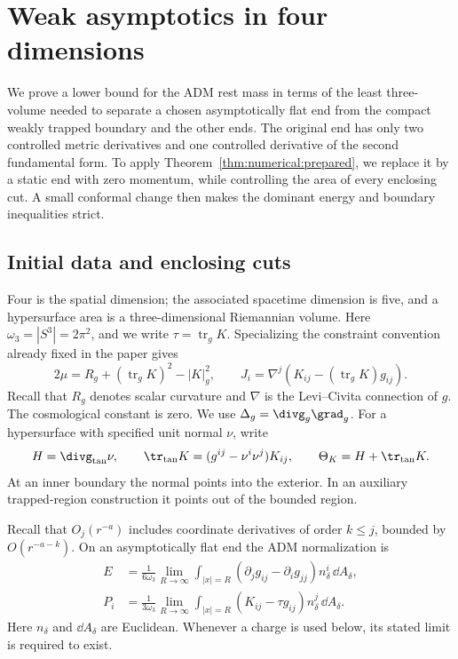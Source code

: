 \section{Weak asymptotics in four dimensions}
\label{n4:sec:introduction}\label{sec:weak4}

We prove a lower bound for the ADM rest mass in terms of the least
three-volume needed to separate a chosen asymptotically flat end from
the compact weakly trapped boundary and the other ends. The original
end has only two controlled metric derivatives and one controlled
derivative of the second fundamental form. To apply
Theorem~\ref{thm:numerical:prepared}, we replace it by a static end with
zero momentum, while controlling the area of every enclosing cut.
A small conformal change then makes the dominant energy and boundary
inequalities strict.

\subsection{Initial data and enclosing cuts}
\label{n4:sec:weak4-data}

Four is the spatial dimension; the associated spacetime dimension is
five, and a hypersurface area is a three-dimensional Riemannian volume.
Here $\omega_3=|S^3|=2\pi^2$, and we write
$\tau=\operatorname{tr}_gK$. Specializing the constraint convention
already fixed in the paper gives
\[
 2\mu=R_g+(\operatorname{tr}_gK)^2-|K|_g^2,\qquad
 J_i=\nabla^j(K_{ij}-(\operatorname{tr}_gK)g_{ij}).
\]
Recall that $R_g$ denotes scalar curvature and $\nabla$ is the
Levi--Civita connection of $g$. The cosmological constant is zero. We use
\(\Delta_g=\divg_g\grad_g\).
For a hypersurface with specified unit normal \(\nu\), write
\[
 H=\divg_{\mathrm{tan}}\nu,\qquad
 \tr_{\mathrm{tan}}K=(g^{ij}-\nu^i\nu^j)K_{ij},\qquad
 \Theta_K=H+\tr_{\mathrm{tan}}K.
\]
At an inner boundary the normal points into the exterior. In an auxiliary
trapped-region construction it points out of the bounded region.

Recall that \(O_j(r^{-a})\) includes coordinate derivatives of order
\(k\le j\), bounded by \(O(r^{-a-k})\). On an asymptotically flat end the
ADM normalization is
\begin{align}
 E&=\frac{1}{6\omega_3}\lim_{R\to\infty}
       \int_{|x|=R}(\partial_jg_{ij}-\partial_i g_{jj})
                    n_\delta^i\,\dd A_\delta,\label{n4:intro:energy}\\
 P_i&=\frac{1}{3\omega_3}\lim_{R\to\infty}
       \int_{|x|=R}(K_{ij}-\tau g_{ij})
                    n_\delta^j\,\dd A_\delta.\label{n4:intro:momentum}
\end{align}
Here \(n_\delta\) and \(\dd A_\delta\) are Euclidean.
Whenever a charge is used below, its stated limit is required to exist.

